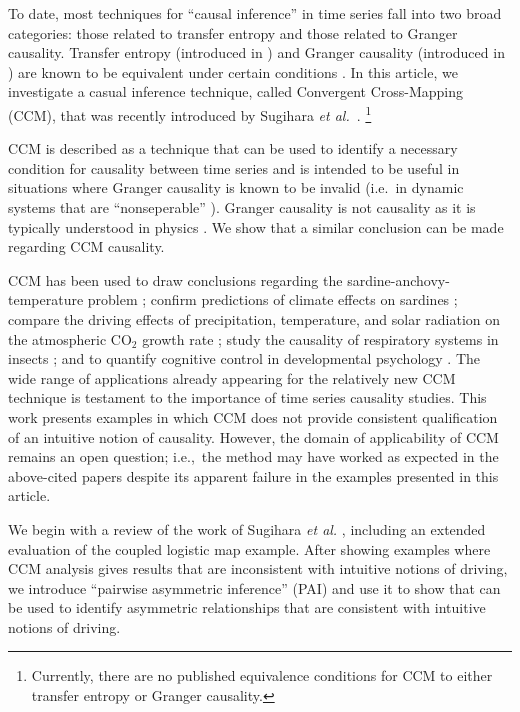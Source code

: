 \documentclass[twocolumn,aps,pre,groupedaddress]{revtex4-1}
\begin{document}
To date, most techniques for ``causal inference'' in time series fall into two broad categories: those related to transfer entropy and those related to Granger causality.  Transfer entropy (introduced in \cite{Schreiber2000}) and Granger causality (introduced in \cite{granger1969}) are known to be equivalent under certain conditions \cite{Barnett2009}.  In this article, we investigate a casual inference technique, called Convergent Cross-Mapping (CCM), that was recently introduced by Sugihara {\em et al.\ }\cite{Sugihara2012}.  \footnote{Currently, there are no published equivalence conditions for CCM to either transfer entropy or Granger causality.}

CCM is described as a technique that can be used to identify a necessary condition for causality between time series and is intended to be useful in situations where Granger causality is known to be invalid (i.e.\ in dynamic systems that are ``nonseperable'' \cite{Sugihara2012}). Granger causality is not causality as it is typically understood in physics \cite{Granger1980,liu2012,Roberts1985}.  We show that a similar conclusion can be made regarding CCM causality. 

CCM has been used to draw conclusions regarding the sardine-anchovy-temperature problem \cite{Sugihara2012}; confirm predictions of climate effects on sardines \cite{Deyle2013}; compare the driving effects of precipitation, temperature, and solar radiation on the atmospheric CO$_2$ growth rate \cite{Wang2014}; study the causality of respiratory systems in insects \cite{Bozorgmagham2013}; and to quantify cognitive control in developmental psychology \cite{Anastas2013}.  The wide range of applications already appearing for the relatively new CCM technique is testament to the importance of time series causality studies.  This work presents examples in which CCM does not provide consistent qualification of an intuitive notion of causality.  However, the domain of applicability of CCM remains an open question; i.e.,\ the method may have worked as expected in the above-cited papers despite its apparent failure in the examples presented in this article. 

We begin with a review of the work of Sugihara {\em et al.} \cite{Sugihara2012}, including an extended evaluation of the coupled logistic map example.  After showing examples where CCM analysis gives results that are inconsistent with intuitive notions of driving, we introduce ``pairwise asymmetric inference'' (PAI) and use it to show that can be used to identify asymmetric relationships that are consistent with intuitive notions of driving.
\end{document}
